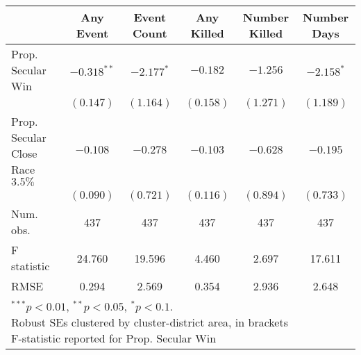 
\begin{tabular}{l c c c c c }
\hline
 & Any Event & Event Count & Any Killed & Number Killed & Number Days \\
\hline
Prop. Secular Win                & $-0.318^{**}$ & $-2.177^{*}$ & $-0.182$  & $-1.256$  & $-2.158^{*}$ \\
                                 & $(0.147)$     & $(1.164)$    & $(0.158)$ & $(1.271)$ & $(1.189)$    \\
Prop. Secular Close Race $3.5\%$ & $-0.108$      & $-0.278$     & $-0.103$  & $-0.628$  & $-0.195$     \\
                                 & $(0.090)$     & $(0.721)$    & $(0.116)$ & $(0.894)$ & $(0.733)$    \\
\hline
Num. obs.                        & 437           & 437          & 437       & 437       & 437          \\
F statistic                      & 24.760        & 19.596       & 4.460     & 2.697     & 17.611       \\
RMSE                             & 0.294         & 2.569        & 0.354     & 2.936     & 2.648        \\
\hline
\multicolumn{6}{l}{\scriptsize{\parbox{.6\linewidth}{\vspace{2pt}$^{***}p<0.01$, $^{**}p<0.05$, $^*p<0.1$. \\
       Robust SEs clustered by cluster-district area, in brackets\\ F-statistic reported for Prop. Secular Win}}}
\end{tabular}

